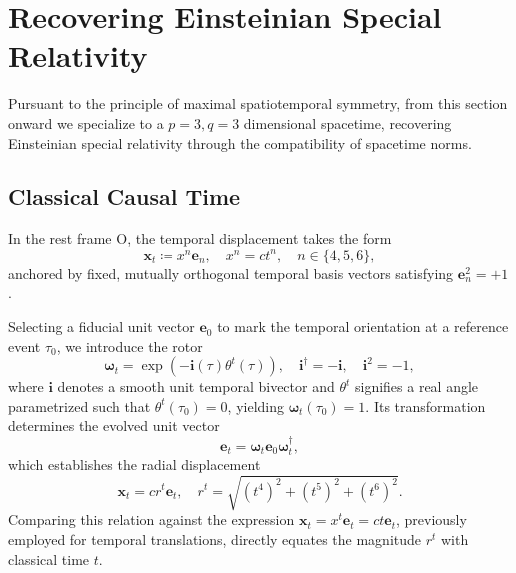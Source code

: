
\section{Recovering Einsteinian Special Relativity}
Pursuant to the principle of maximal spatiotemporal symmetry, from this section onward we specialize to a $p=3, q=3$ dimensional spacetime, recovering Einsteinian special relativity through the compatibility of spacetime norms.

\subsection{Classical Causal Time}
In the rest frame $\mathrm{O}$, the temporal displacement takes the form
\begin{equation}\label{eq_temporal_displacement_vector}
    \mathbf{x}_{t} \coloneqq x^{n}\mathbf{e}_{n}, \quad x^{n} = ct^{n}, \quad n \in \{4,5,6\},
\end{equation}
anchored by fixed, mutually orthogonal temporal basis vectors satisfying $\mathbf{e}_{n}^{2} = +1$.

Selecting a fiducial unit vector $\mathbf{e}_{0}$ to mark the temporal orientation at a reference event $\tau_{0}$, we introduce the rotor
\begin{equation}
    \boldsymbol{\omega}_{t} = \exp(-\mathbf{i}(\tau)\theta^{t}(\tau)), \quad \mathbf{i}^{\dagger} = -\mathbf{i}, \quad \mathbf{i}^{2} = -1,
\end{equation}
where $\mathbf{i}$ denotes a smooth unit temporal bivector and $\theta^{t}$ signifies a real angle parametrized such that $\theta^{t}(\tau_{0}) = 0$, yielding $\boldsymbol{\omega}_{t}(\tau_{0}) = 1$. Its transformation determines the evolved unit vector
\begin{equation}\label{eq_pole_from_flag}
    \mathbf{e}_{t} = \boldsymbol{\omega}_{t}\mathbf{e}_{0}\boldsymbol{\omega}_{t}^{\dagger},
\end{equation}
which establishes the radial displacement
\begin{equation}
    \mathbf{x}_{t} = c r^{t}\mathbf{e}_{t}, \quad r^{t} = \sqrt{(t^{4})^{2} + (t^{5})^{2} + (t^{6})^{2}}.
\end{equation}
Comparing this relation against the expression $\mathbf{x}_{t} = x^{t}\mathbf{e}_{t} = ct\mathbf{e}_{t}$, previously employed for temporal translations, directly equates the magnitude $r^{t}$ with classical time $t$.

